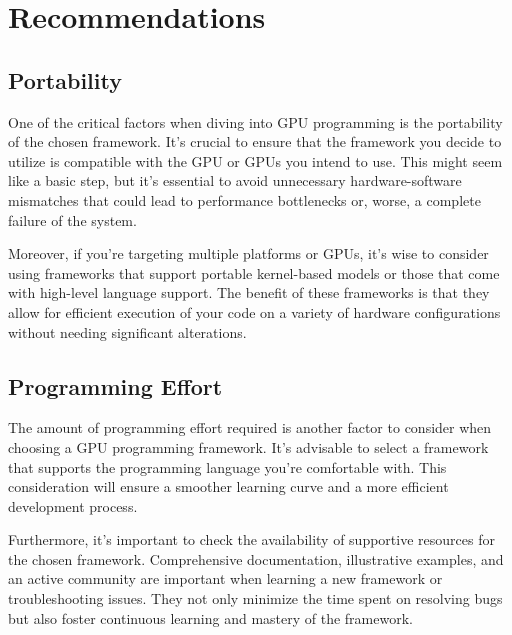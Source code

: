 \section{Recommendations}


\subsection{Portability}


\par
One of the critical factors when diving into GPU programming is the portability of the chosen framework.
It’s crucial to ensure that the framework you decide to utilize is compatible with the GPU or GPUs you intend to use. 
This might seem like a basic step, but it’s essential to avoid unnecessary hardware-software mismatches that could lead to performance bottlenecks or, worse, a complete failure of the system.


\par
Moreover, if you’re targeting multiple platforms or GPUs, it’s wise to consider using frameworks that support portable kernel-based models or those that come with high-level language support.
The benefit of these frameworks is that they allow for efficient execution of your code on a variety of hardware configurations without needing significant alterations.




\subsection{Programming Effort}


\par
The amount of programming effort required is another factor to consider when choosing a GPU programming framework.
It’s advisable to select a framework that supports the programming language you’re comfortable with.
This consideration will ensure a smoother learning curve and a more efficient development process.


\par
Furthermore, it’s important to check the availability of supportive resources for the chosen framework.
Comprehensive documentation, illustrative examples, and an active community are important when learning a new framework or troubleshooting issues.
They not only minimize the time spent on resolving bugs but also foster continuous learning and mastery of the framework.


